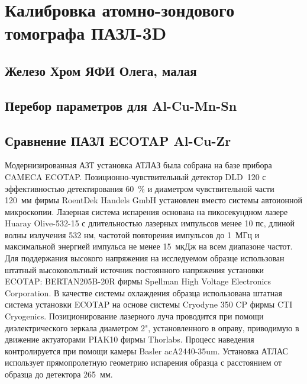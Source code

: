 \chapter{Калибровка атомно-зондового томографа ПАЗЛ-3D}\label{ch:ch3}

\section{Железо Хром ЯФИ Олега, малая}\label{sec:ch3/sect1}

\section{Перебор параметров для Al-Cu-Mn-Sn}\label{sec:ch3/sect2}

\section{Сравнение ПАЗЛ ECOTAP Al-Cu-Zr}\label{sec:ch3/sect3}

Модернизированная АЗТ установка АТЛАЗ была собрана на базе прибора CAMECA ECOTAP. Позиционно-чувствительный детектор DLD~120 с эффективностью детектирования 60~$\%$ и диаметром чувствительной части 120~мм фирмы RoentDek Handels GmbH установлен вместо системы автоионной микроскопии. Лазерная система испарения основана на пикосекундном лазере Huaray Olive-532-15 с длительностью лазерных импульсов менее 10 пс, длиной волны излучения 532 нм, частотой повторения импульсов до 1~МГц и максимальной энергией импульса не менее 15~мкДж на всем диапазоне частот. Для поддержания высокого напряжения на исследуемом образце использован штатный высоковольтный источник постоянного напряжения установки ECOTAP: BERTAN205B-20R фирмы Spellman High Voltage Electronics Corporation. В качестве системы охлаждения образца использована штатная система установки ECOTAP на основе системы Cryodyne 350 CP фирмы CTI Cryogenics. Позиционирование лазерного луча проводится при помощи диэлектрического зеркала диаметром 2", установленного в оправу, приводимую в движение актуаторами PIAK10 фирмы Thorlabs. Процесс наведения контролируется при помощи камеры Basler acA2440-35um. Установка АТЛАС использует прямопролетную геометрию испарения образца с расстоянием от образца до детектора 265~мм.

